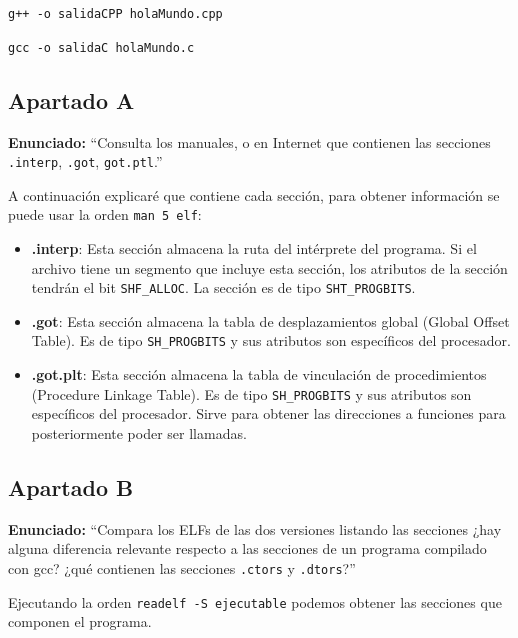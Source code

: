 \documentclass{article}
\begin{document}
\verb|g++ -o salidaCPP holaMundo.cpp|

\verb|gcc -o salidaC holaMundo.c|

\bigskip


\subsection{Apartado A}

\textbf{Enunciado: }``Consulta los manuales, o en Internet que contienen las secciones \texttt{.interp}, \texttt{.got}, \texttt{got.ptl}.''

\bigskip

A continuación explicaré que contiene cada sección, para obtener información se puede usar la orden \verb|man 5 elf|:

\begin{itemize}
    \item \textbf{.interp}: Esta sección almacena la ruta del intérprete del programa. Si el archivo tiene un segmento que incluye esta sección, los atributos de la sección tendrán el bit \texttt{SHF\_ALLOC}. La sección es de tipo \texttt{SHT\_PROGBITS}.
    
    \item \textbf{.got}: Esta sección almacena la tabla de desplazamientos global (Global Offset Table). Es de tipo \texttt{SH\_PROGBITS} y sus atributos son específicos del procesador. 
    
    \item \textbf{.got.plt}: Esta sección almacena la tabla de vinculación de procedimientos (Procedure Linkage Table). Es de tipo \texttt{SH\_PROGBITS} y sus atributos son específicos del procesador. Sirve para obtener las direcciones a funciones para posteriormente poder ser llamadas.
\end{itemize}

\newpage
\subsection{Apartado B}

\textbf{Enunciado: }``Compara los ELFs de las dos versiones listando las secciones ¿hay alguna diferencia relevante respecto a las secciones de un programa compilado con gcc? ¿qué contienen las secciones \texttt{.ctors} y \texttt{.dtors}?''

\bigskip

Ejecutando la orden \verb|readelf -S ejecutable| podemos obtener las secciones que componen el programa.
\end{document}
